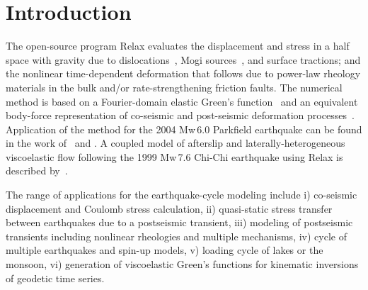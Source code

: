 \documentclass[10pt]{article}
\begin{document}
\pagebreak
{}





\maketitle 


\vspace{1cm}


\pagestyle{fancy}
\cfoot{\thepage}

\section{Introduction}

The open-source program Relax evaluates the displacement and stress in a half space with gravity due to dislocations~\citep[e.g.,][]{okada92}, Mogi sources~\citep{mogi58}, and surface tractions; and the nonlinear time-dependent deformation that follows due to power-law rheology materials in the bulk and/or rate-strengthening friction faults. The numerical method is based on a Fourier-domain elastic Green's function~\citep{barbot+09b,barbot&fialko10a} and an equivalent body-force representation of co-seismic and post-seismic deformation processes~\citep{barbot+09a,barbot&fialko10b}. Application of the method for the 2004 Mw\,6.0 Parkfield earthquake can be found in the work of~\cite{barbot+09a} and \cite{bruhat+11}. A coupled model of afterslip and laterally-heterogeneous viscoelastic flow following the 1999 Mw\,7.6 Chi-Chi earthquake using Relax is described by~\cite{rousset+12}.

The range of applications for the earthquake-cycle modeling include i) co-seismic displacement and Coulomb stress calculation, ii) quasi-static stress transfer between earthquakes due to a postseismic transient, iii) modeling of postseismic transients including nonlinear rheologies and multiple mechanisms, iv) cycle of multiple earthquakes and spin-up models, v) loading cycle of lakes or the monsoon, vi) generation of viscoelastic Green's functions for kinematic inversions of geodetic time series.
\end{document}
